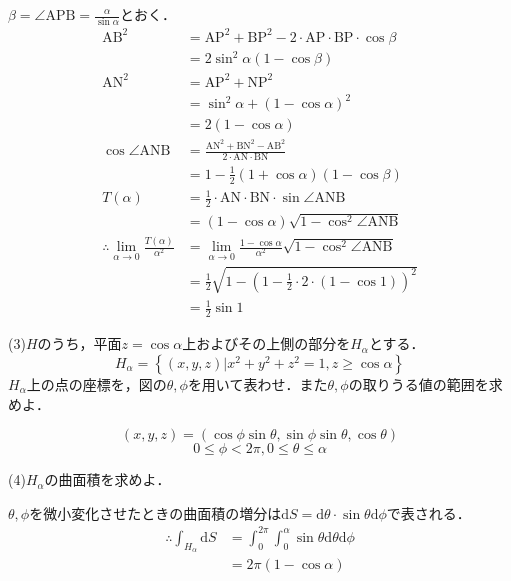 \documentclass[a4j]{jarticle}
\begin{document}
$\beta = \angle \mbox{APB}=\frac{\alpha}{\sin\alpha}$とおく．
\begin{align*}
 \mbox{AB}^2 &=\mbox{AP}^2 + \mbox{BP}^2 - 2 \cdot \mbox{AP} \cdot \mbox{BP} \cdot \cos \beta \\
 &= 2\sin^2\alpha(1-\cos\beta)\\
 \mbox{AN}^2 &= \mbox{AP}^2 + \mbox{NP}^2\\
 &= \sin^2\alpha + (1-\cos\alpha)^2\\
 &= 2(1-\cos\alpha)\\
 \cos\angle\mbox{ANB}&=\frac{\mbox{AN}^2+\mbox{BN}^2-\mbox{AB}^2}{2\cdot \mbox{AN}\cdot\mbox{BN}}\\
 &= 1- \frac{1}{2}(1+\cos\alpha)(1-\cos\beta)\\
 T(\alpha) &= \frac{1}{2}\cdot\mbox{AN}\cdot\mbox{BN}\cdot\sin\angle\mbox{ANB}\\
 &= (1-\cos\alpha)\sqrt{1-\cos^2\angle\mbox{ANB}}\\
 \therefore \lim_{\alpha\rightarrow 0}\frac{T(\alpha)}{\alpha^2} &= \lim_{\alpha\rightarrow 0}\frac{1-\cos\alpha}{\alpha^2}\sqrt{1-\cos^2\angle\mbox{ANB}}\\
 &= \frac{1}{2}\sqrt{1-\left(1-\frac{1}{2}\cdot 2 \cdot (1-\cos 1)\right)^2}\\
 &= \frac{1}{2}\sin 1
\end{align*}

\begin{screen}
 (3)$H$のうち，平面$z=\cos\alpha$上およびその上側の部分を$H_\alpha$とする．
 $$H_\alpha = \left\{(x,y,z)|x^2+y^2+z^2 = 1, z \geq \cos\alpha \right\}$$
 $H_\alpha$上の点の座標を，図の$\theta,\phi$を用いて表わせ．また$\theta,\phi$の取りうる値の範囲を求めよ．
\end{screen}

$$\left(x,y,z\right)=\left(\cos\phi\sin\theta,\sin\phi\sin\theta,\cos\theta\right)$$
$$0\leq\phi<2\pi,0\leq\theta\leq\alpha$$

\begin{screen}
 (4)$H_\alpha$の曲面積を求めよ．
\end{screen}

$\theta,\phi$を微小変化させたときの曲面積の増分は$\mathrm{d}S = \mathrm{d}\theta \cdot \sin\theta \mathrm{d} \phi$で表される．
\begin{align*}
 \therefore \int_{H_\alpha}\mathrm{d}S &= \int_0^{2\pi}\int_0^\alpha \sin\theta\mathrm{d}\theta\mathrm{d}\phi\\
 &= 2\pi(1-\cos\alpha)
\end{align*}
\end{document}
